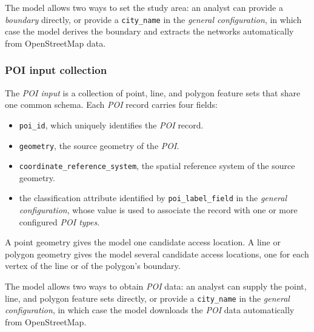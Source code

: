 \documentclass{article}
\begin{document}
    The model allows two ways to set the study area: an analyst can provide a \emph{boundary} directly, or provide a \texttt{city\_name} in the \emph{general configuration}, in which case the model derives the boundary and extracts the networks automatically from OpenStreetMap data.
\subsubsection*{POI input collection}
    The \emph{POI input} is a collection of point, line, and polygon feature sets that
    share one common schema. Each \emph{POI} record carries four fields:
    \begin{itemize}
        \item \texttt{poi\_id}, which uniquely identifies the \emph{POI} record.
        \item \texttt{geometry}, the source geometry of the \emph{POI}.
        \item \texttt{coordinate\_reference\_system}, the spatial reference system
        of the source geometry.
        \item the classification attribute identified by
        \texttt{poi\_label\_field} in the \emph{general configuration}, whose value is
        used to associate the record with one or more configured
        \emph{POI types}.
    \end{itemize}
    A point geometry gives the model one candidate access location. A line or polygon geometry gives the model several candidate access locations, one for each vertex of the line or of the polygon's boundary.

    The model allows two ways to obtain \emph{POI} data: an analyst can supply the point, line, and polygon feature sets directly, or provide a \texttt{city\_name} in the \emph{general configuration}, in which case the model downloads the \emph{POI} data automatically from OpenStreetMap.
\end{document}
